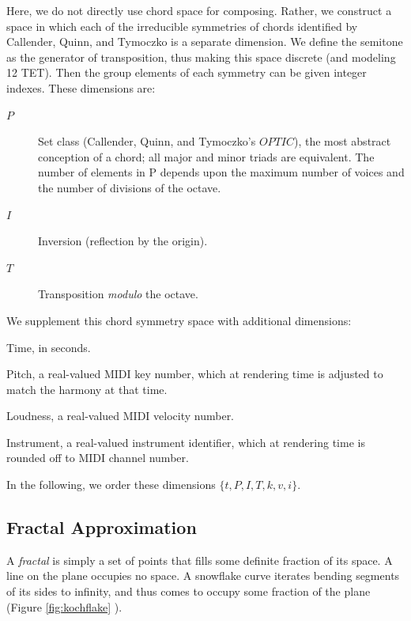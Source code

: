 \documentclass[english,11pt,letterpaper,onecolumn]{scrartcl}
\numberwithin{equation}{section}
\begin{document}
Here, we do not directly use chord space for composing. Rather, we construct a
space in which each of the irreducible symmetries of chords identified by
Callender, Quinn, and Tymoczko is a separate dimension. We define the semitone
as the generator of transposition, thus making this space discrete (and modeling
12 TET). Then the group elements of each symmetry can be given integer indexes.
These dimensions are:
\begin{description}
\item[$P$] Set class (Callender, Quinn, and Tymoczko's $OPTIC$), the
most abstract conception of a chord; all major and minor triads are equivalent.
The number of elements in P depends upon the maximum number of voices and the
number of divisions of the octave.
\item[$I$] Inversion (reflection by the origin).
\item[$T$] Transposition \emph{modulo} the octave.
\end{description}

\noindent We supplement this chord symmetry space with additional dimensions:
\begin{description}[resume]
\item[$t$] Time, in seconds.
\item[$k$] Pitch, a real-valued MIDI key number, which at rendering time is
adjusted to match the harmony at that time.
\item[$v$] Loudness, a real-valued MIDI velocity number.
\item[$i$] Instrument, a real-valued instrument identifier, which at rendering
time is rounded off to MIDI channel number.
\end{description}

\noindent In the following, we order these dimensions $\{t, P, I, T, k, v, i\}$.

\subsection{Fractal Approximation}

A \textit{fractal} is simply a set of points that fills some definite fraction
of its space. A line on the plane occupies no space. A snowflake curve
iterates bending segments of its sides to infinity, and thus comes to occupy
some fraction of the plane (Figure \ref{fig:kochflake}
\cite{Mandelbrot:1982:FGN}).
\end{document}

